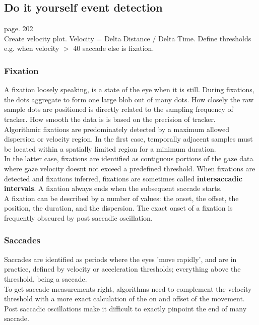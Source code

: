 \documentclass[12pt]{article}
\theoremstyle{definition}
\begin{document}
\subsection{Do it yourself event detection}
page. 202 \\

Create velocity plot. 
Velocity = Delta Distance / Delta Time. 
Define thresholds e.g. when velocity $>$ 40 saccade else is fixation. 

\subsubsection{Fixation}
A fixation loosely speaking, is a state of the eye when it is still.
During fixations, the dots aggregate to form one large blob out of many dots. How closely the raw sample dots are positioned is directly related to the sampling frequency of tracker. How smooth the data is is based on the precision of tracker.\\

Algorithmic fixations are predominately detected by a maximum allowed dispersion or velocity region. In the first case, temporally adjacent samples must be located within a spatially limited region for a minimum duration.\\

In the latter case, fixations are identified as contiguous portions of the gaze data where gaze velocity doesnt not exceed a predefined threshold. When fixations are detected and fixations inferred, fixations are sometimes called \textbf{intersaccadic intervals}. A fixation always ends when the subsequent saccade starts.\\

A fixation can be described by a number of values: the onset, the offset, the position, the duration, and the dispersion. The exact onset of a fixation is frequently obscured by post saccadic oscillation. 

\subsubsection{Saccades}
Saccades are identified as periods where the eyes 'move rapidly', and are in practice, defined by velocity or acceleration thresholds; everything above the threshold, being a saccade.\\

To get saccade measurements right, algorithms need to complement the velocity threshold with a more exact calculation of the on and offset of the movement. Post saccadic oscillations make it difficult to exactly pinpoint the end of many saccade.\\
\end{document}
